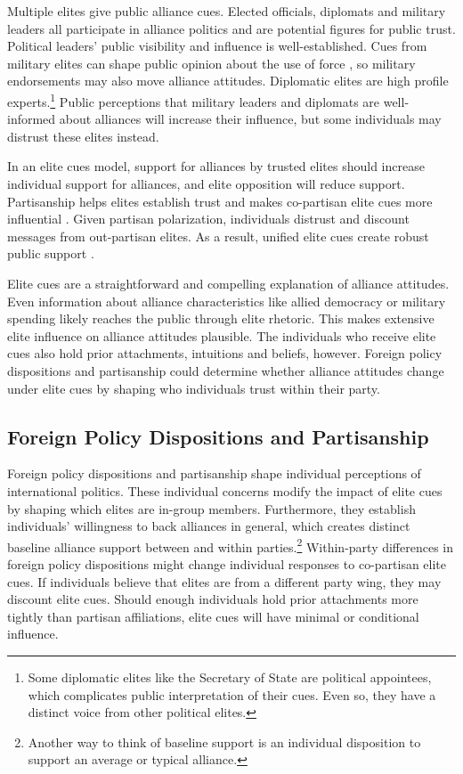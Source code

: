 \documentclass[12pt]{article}
\begin{document}
Multiple elites give public alliance cues.
Elected officials, diplomats and military leaders all participate in alliance politics and are potential figures for public trust.
Political leaders' public visibility and influence is well-established.
Cues from military elites can shape public opinion about the use of force \citep{Golbyetal2018}, so military endorsements may also move alliance attitudes. 
Diplomatic elites are high profile experts.\footnote{Some diplomatic elites like the Secretary of State are political appointees, which complicates public interpretation of their cues. Even so, they have a distinct voice from other political elites.}
Public perceptions that military leaders and diplomats are well-informed about alliances will increase their influence, but some individuals may distrust these elites instead.


In an elite cues model, support for alliances by trusted elites should increase individual support for alliances, and elite opposition will reduce support.   
Partisanship helps elites establish trust and makes co-partisan elite cues more influential \citep{Druckmanetal2013}.
Given partisan polarization, individuals distrust and discount messages from out-partisan elites.
As a result, unified elite cues create robust public support \citep{Berinsky2007}.


Elite cues are a straightforward and compelling explanation of alliance attitudes.
Even information about alliance characteristics like allied democracy or military spending likely reaches the public through elite rhetoric. 
This makes extensive elite influence on alliance attitudes plausible. 
The individuals who receive elite cues also hold prior attachments, intuitions and beliefs, however.
Foreign policy dispositions and partisanship could determine whether alliance attitudes change under elite cues by shaping who individuals trust within their party.


\subsection{Foreign Policy Dispositions and Partisanship}


Foreign policy dispositions and partisanship shape individual perceptions of international politics. 
These individual concerns modify the impact of elite cues by shaping which elites are in-group members.
Furthermore, they establish individuals' willingness to back alliances in general, which creates distinct baseline alliance support between and within parties.\footnote{Another way to think of baseline support is an individual disposition to support an average or typical alliance.}
Within-party differences in foreign policy dispositions might change individual responses to co-partisan elite cues.
If individuals believe that elites are from a different party wing, they may discount elite cues.  
Should enough individuals hold prior attachments more tightly than partisan affiliations, elite cues will have minimal or conditional influence.
\end{document}
